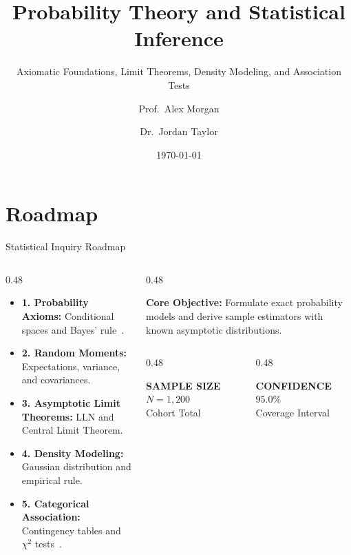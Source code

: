 \documentclass[aspectratio=169, 9pt]{beamer}
\title{Probability Theory and Statistical Inference}
\subtitle{Axiomatic Foundations, Limit Theorems, Density Modeling, and Association Tests}
\author{Prof.~Alex Morgan \and Dr.~Jordan Taylor}
\institute{Department of Statistics \& Mathematical Sciences}
\date{\today}
\newcommand{\kpicard}[3]{%
  \begin{tcolorbox}[enhanced, colframe=structure!20, colback=structure!3, boxrule=0.5pt, arc=2pt,
    left=3pt, right=3pt, top=2.5pt, bottom=2.5pt, halign=center]
    {\fontsize{6pt}{7pt}\selectfont\bfseries\textcolor{structure}{#1}}\\[1pt]
    {\normalsize\bfseries\textcolor{accent}{#2}}\\[1pt]
    {\tiny\textcolor{structure!70}{#3}}
  \end{tcolorbox}%
}
\begin{document}
\begin{frame}[plain]
    \titlepage
\end{frame}

\section{Roadmap}
\begin{frame}{Statistical Inquiry Roadmap}
    \begin{columns}[c]
        \begin{column}{0.48\textwidth}
            \par\vspace{0.3em}
            \begin{itemize}\setlength{\itemsep}{2.5pt}
                \item \textbf{1. Probability Axioms:} Conditional spaces and Bayes' rule~\cite{feller1968introduction}.
                \item \textbf{2. Random Moments:} Expectations, variance, and covariances.
                \item \textbf{3. Asymptotic Limit Theorems:} LLN and Central Limit Theorem.
                \item \textbf{4. Density Modeling:} Gaussian distribution and empirical rule.
                \item \textbf{5. Categorical Association:} Contingency tables and $\chi^2$ tests~\cite{casella2002statistical}.
            \end{itemize}
        \end{column}
        \begin{column}{0.48\textwidth}
            \begin{takeaway}
                \textbf{\textcolor{accent}{Core Objective:}} Formulate exact probability models and derive sample estimators with known asymptotic distributions.
            \end{takeaway}
            \vspace{0.4em}
            \begin{columns}[c]
                \begin{column}{0.48\textwidth}
                    \kpicard{SAMPLE SIZE}{$N = 1{,}200$}{Cohort Total}
                \end{column}
                \begin{column}{0.48\textwidth}
                    \kpicard{CONFIDENCE}{$95.0\%$}{Coverage Interval}
                \end{column}
            \end{columns}
        \end{column}
    \end{columns}
\end{frame}
\end{document}
